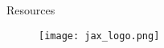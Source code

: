 \documentclass[dvipsnames, 9pt]{beamer}
\begin{document}
\begin{frame}
\begin{columns}
\begin{column}{0.4\textwidth}
\begin{figure}
 \end{figure}
        \end{column}
    \end{columns}
\end{frame}






\begin{frame}{Resources}
\begin{figure}[H]
\centering
\texttt{[image: jax\_logo.png]}
\end{figure}
\end{frame}
\end{document}
